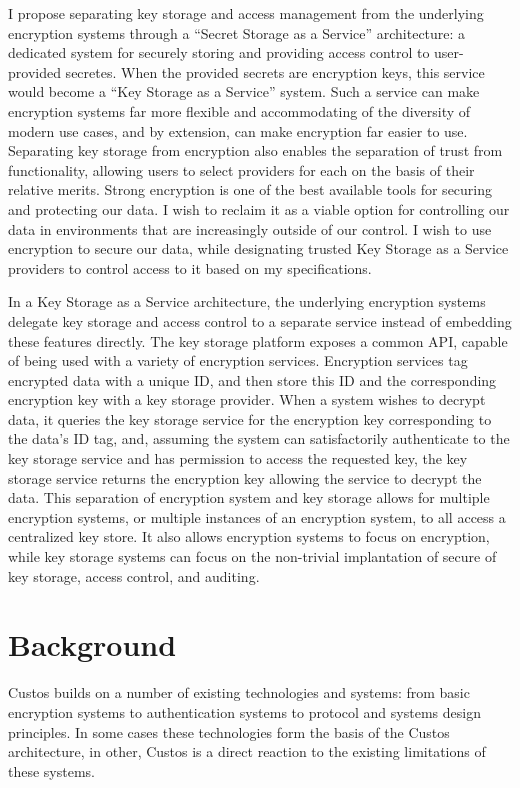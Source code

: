 I propose separating key storage and access management from the
underlying encryption systems through a ``Secret Storage as a
Service'' architecture: a dedicated system for securely storing and
providing access control to user-provided secretes. When the provided
secrets are encryption keys, this service would become a ``Key Storage
as a Service'' system. Such a service can make encryption systems far
more flexible and accommodating of the diversity of modern use cases,
and by extension, can make encryption far easier to use. Separating
key storage from encryption also enables the separation of trust from
functionality, allowing users to select providers for each on the
basis of their relative merits. Strong encryption is one of the best
available tools for securing and protecting our data. I wish to
reclaim it as a viable option for controlling our data in environments
that are increasingly outside of our control. I wish to use encryption
to secure our data, while designating trusted Key Storage as a Service
providers to control access to it based on my specifications.

In a Key Storage as a Service architecture, the underlying encryption
systems delegate key storage and access control to a separate service
instead of embedding these features directly. The key storage platform
exposes a common API, capable of being used with a variety of
encryption services. Encryption services tag encrypted data with a
unique ID, and then store this ID and the corresponding encryption key
with a key storage provider. When a system wishes to decrypt data, it
queries the key storage service for the encryption key corresponding
to the data's ID tag, and, assuming the system can satisfactorily
authenticate to the key storage service and has permission to access
the requested key, the key storage service returns the encryption key
allowing the service to decrypt the data. This separation of
encryption system and key storage allows for multiple encryption
systems, or multiple instances of an encryption system, to all access
a centralized key store. It also allows encryption systems to focus on
encryption, while key storage systems can focus on the non-trivial
implantation of secure of key storage, access control, and auditing.

\section{Background}

Custos builds on a number of existing technologies and systems: from
basic encryption systems to authentication systems to protocol and
systems design principles. In some cases these technologies form the
basis of the Custos architecture, in other, Custos is a direct
reaction to the existing limitations of these systems.

